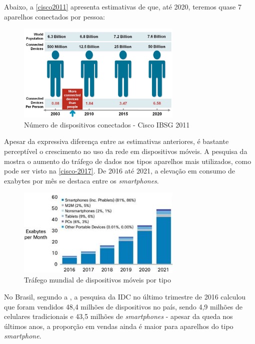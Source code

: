 Abaixo, a \autoref{cisco2011} apresenta estimativas de que, até 2020, teremos quase 7 aparelhos conectados por pessoa:

\begin{figure}[htb]
  \caption{\label{cisco2011}Número de dispositivos conectados - Cisco IBSG 2011}
  \begin{center}
    \includegraphics[width=0.70\textwidth]{img/cisco-2011.png}
  \end{center}
\end{figure}

Apesar da expressiva diferença entre as estimativas anteriores, é bastante perceptível o crescimento no uso da rede em dispositivos móveis. A pesquisa da  mostra o aumento do tráfego de dados nos tipos aparelhos mais utilizados, como pode ser visto na \autoref{cisco-2017}. De 2016 até 2021, a elevação em consumo de exabytes por mês se destaca entre os \emph{smartphones}.

\begin{figure}[htb]
  \caption{\label{cisco-2017}Tráfego mundial de dispositivos móveis por tipo}
  \begin{center}
    \includegraphics[width=0.70\textwidth]{img/cisco-2017.png}
  \end{center}
\end{figure}

No Brasil, segundo a , a pesquisa da IDC no último trimestre de 2016 calculou que foram vendidos 48,4 milhões de dispositivos no país, sendo 4,9 milhões de celulares tradicionais e 43,5 milhões de \emph{smartphones} - apesar da queda nos últimos anos, a proporção em vendas ainda é maior para aparelhos do tipo \emph{smartphone}. 

